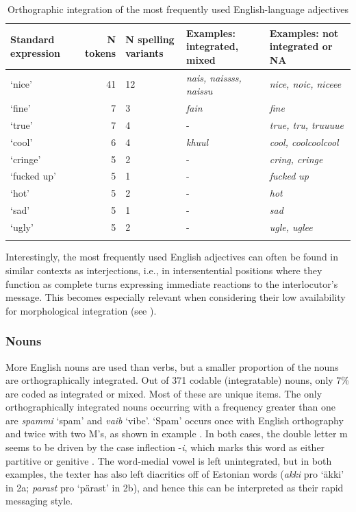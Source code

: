 \documentclass[output=paper]{langscibook}
\begin{document}
\begin{table}[t]
  \caption{Orthographic integration of the most frequently used English-language adjectives}
\begin{tabularx}{\textwidth}{QrYQQ}
\lsptoprule
{Standard} {expression} & {N} {tokens} & {N} {spelling} {variants} & {Examples:} {integrated,} {mixed}  & {Examples:} {not} {integrated} {or} {NA}\\
\midrule
‘nice’ & 41 & 12 & \textit{nais, naissss, naissu} & \textit{nice, noic, niceee}\\
‘fine’ & 7 & 3 & \textit{fain} & \textit{fine}\\
‘true’ & 7 & 4 & {}- & \textit{true, tru, truuuue} \\
‘cool’ & 6 & 4 & \textit{khuul} & \textit{cool, coolcoolcool}\\
‘cringe’ & 5 & 2 & {}- & \textit{cring, cringe}\\
‘fucked up’ & 5 & 1 & {}- & \textit{fucked up}\\
‘hot’ & 5 & 2 & {}- & \textit{hot}\\
‘sad’ & 5 & 1 & {}- & \textit{sad}\\
‘ugly’ & 5 & 2 & {}- & \textit{ugle, uglee}\\
\lspbottomrule
\end{tabularx}%
\label{tab:vihmanetal:5}
\end{table}

Interestingly, the most frequently used English adjectives can often be found in similar contexts as interjections, i.e., in intersentential positions where they function as complete turns expressing immediate reactions to the interlocutor’s message. This becomes especially relevant when considering their low availability for morphological integration (see ).

\subsubsection{Nouns}

More English nouns are used than verbs, but a smaller proportion of the nouns are orthographically integrated. Out of 371 codable (integratable) nouns, only 7\% are coded as integrated or mixed. Most of these are unique items. The only orthographically integrated nouns occurring with a frequency greater than one are \textit{spammi} ‘spam’ and \textit{vaib} ‘vibe’. ‘Spam’ occurs once with English orthography and twice with two M’s, as shown in example . In both cases, the double letter m seems to be driven by the case inflection -\textit{i}, which marks this word as either partitive  or genitive . The word-medial vowel is left unintegrated, but in both examples, the texter has also left diacritics off of Estonian words (\textit{akki} pro ‘äkki’ in 2a; \textit{parast} pro ‘pärast’ in 2b), and hence this can be interpreted as their rapid messaging style.
\end{document}

